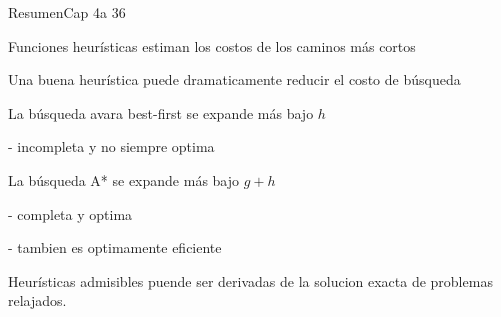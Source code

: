 \begin{frame}{Resumen}{Cap 4a 36}
\begin{right}
Funciones heurísticas estiman los costos de los caminos más cortos

Una buena heurística puede dramaticamente reducir el costo de búsqueda

La búsqueda avara best-first se expande más bajo $h$

- incompleta y no siempre optima

La búsqueda A* se expande más bajo $g + h$

- completa y optima

- tambien es optimamente eficiente

Heurísticas admisibles puende ser derivadas de la solucion exacta de problemas relajados.

\end{right}
\end{frame}
